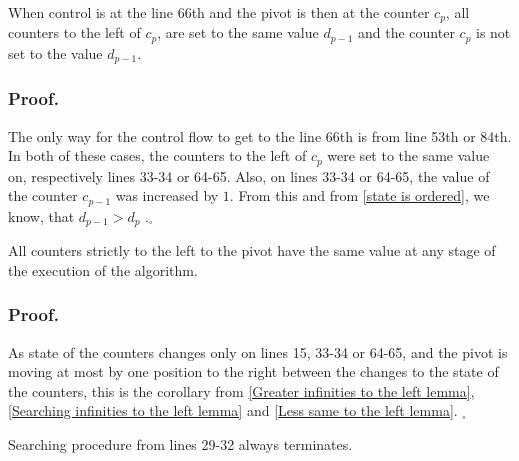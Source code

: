 \begin{lemma}\label{Less same to the left lemma}
When control is at the line 66th and the pivot is then at the counter $c_p$, all counters 
to the left of $c_p$, are set to the same value $d_{p-1}$ and the counter $c_p$ 
is not set to the value $d_{p-1}$. 
\end{lemma}
\subsubsection{Proof.}
The only way for the control flow to get to the line 66th is from line 53th or 84th. 
In both of these cases, the counters to the left of $c_p$ were set to the same value on, 
respectively lines 33-34 or 64-65. Also, on lines 33-34 or 64-65, the value 
of the counter $c_{p-1}$ was increased by $1$. From this and 
from \ref{state is ordered}, we know, that $d_{p-1} > d_p$ 
.$_\square$

\begin{lemma}\label{same value on the counters to the left}
All counters strictly to the left to the pivot have the same value 
 at any stage of 
the execution of the algorithm.
\end{lemma}
\subsubsection{Proof.}
As state of the counters changes only on lines 15, 33-34 or 64-65, and 
the pivot is moving at most by one position to the right 
between the changes to the state of the counters, this is the 
corollary from \ref{Greater infinities to the left lemma}, 
\ref{Searching infinities to the left lemma} and \ref{Less same to the left lemma}. $_\square$

\begin{lemma}\label{Small searching always terminates}
Searching procedure from lines 29-32 always terminates.
\end{lemma}
